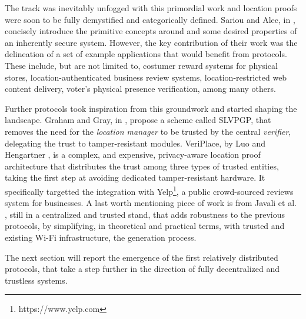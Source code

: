 The \pol{} track was inevitably unfogged with this primordial work and location proofs were soon to be fully demystified and categorically defined. Sariou and Alec, in \cite{saroiu2009enabling}, concisely introduce the primitive concepts around \pol{} and some desired properties of an inherently secure system. However, the key contribution of their work was the delineation of a set of example applications that would benefit from \pol{} protocols. These include, but are not limited to, costumer reward systems for physical stores, location-authenticated business review systems, location-restricted web content delivery, voter's physical presence verification, among many others.

Further protocols took inspiration from this groundwork and started shaping the landscape. Graham and Gray, in \cite{graham2009protecting}, propose a \pol{} scheme called SLVPGP, that removes the need for the \emph{location manager} to be trusted by the central \emph{verifier}, delegating the trust to tamper-resistant modules. VeriPlace, by Luo and Hengartner \cite{luo2010veriplace}, is a complex, and expensive, privacy-aware location proof architecture that distributes the trust among three types of trusted entities, taking the first step at avoiding dedicated tamper-resistant hardware. It specifically targetted the integration with Yelp\footnote{https://www.yelp.com}, a public crowd-sourced reviews system for businesses. A last worth mentioning piece of work is from Javali et al. \cite{javali2016alice}, still in a centralized and trusted stand, that adds robustness to the previous protocols, by simplifying, in theoretical and practical terms, with trusted and existing Wi-Fi infrastructure, the \pol{} generation process.

The next section will report the emergence of the first relatively distributed \pol{} protocols, that take a step further in the direction of fully decentralized and trustless systems.